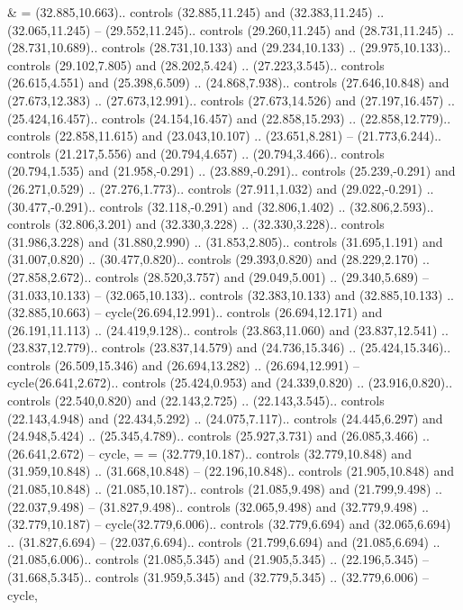 {&} = {(32.885,10.663).. controls (32.885,11.245) and (32.383,11.245) .. (32.065,11.245) -- (29.552,11.245).. controls (29.260,11.245) and (28.731,11.245) .. (28.731,10.689).. controls (28.731,10.133) and (29.234,10.133) .. (29.975,10.133).. controls (29.102,7.805) and (28.202,5.424) .. (27.223,3.545).. controls (26.615,4.551) and (25.398,6.509) .. (24.868,7.938).. controls (27.646,10.848) and (27.673,12.383) .. (27.673,12.991).. controls (27.673,14.526) and (27.197,16.457) .. (25.424,16.457).. controls (24.154,16.457) and (22.858,15.293) .. (22.858,12.779).. controls (22.858,11.615) and (23.043,10.107) .. (23.651,8.281) -- (21.773,6.244).. controls (21.217,5.556) and (20.794,4.657) .. (20.794,3.466).. controls (20.794,1.535) and (21.958,-0.291) .. (23.889,-0.291).. controls (25.239,-0.291) and (26.271,0.529) .. (27.276,1.773).. controls (27.911,1.032) and (29.022,-0.291) .. (30.477,-0.291).. controls (32.118,-0.291) and (32.806,1.402) .. (32.806,2.593).. controls (32.806,3.201) and (32.330,3.228) .. (32.330,3.228).. controls (31.986,3.228) and (31.880,2.990) .. (31.853,2.805).. controls (31.695,1.191) and (31.007,0.820) .. (30.477,0.820).. controls (29.393,0.820) and (28.229,2.170) .. (27.858,2.672).. controls (28.520,3.757) and (29.049,5.001) .. (29.340,5.689) -- (31.033,10.133) -- (32.065,10.133).. controls (32.383,10.133) and (32.885,10.133) .. (32.885,10.663) -- cycle(26.694,12.991).. controls (26.694,12.171) and (26.191,11.113) .. (24.419,9.128).. controls (23.863,11.060) and (23.837,12.541) .. (23.837,12.779).. controls (23.837,14.579) and (24.736,15.346) .. (25.424,15.346).. controls (26.509,15.346) and (26.694,13.282) .. (26.694,12.991) -- cycle(26.641,2.672).. controls (25.424,0.953) and (24.339,0.820) .. (23.916,0.820).. controls (22.540,0.820) and (22.143,2.725) .. (22.143,3.545).. controls (22.143,4.948) and (22.434,5.292) .. (24.075,7.117).. controls (24.445,6.297) and (24.948,5.424) .. (25.345,4.789).. controls (25.927,3.731) and (26.085,3.466) .. (26.641,2.672) -- cycle},
{=} = {(32.779,10.187).. controls (32.779,10.848) and (31.959,10.848) .. (31.668,10.848) -- (22.196,10.848).. controls (21.905,10.848) and (21.085,10.848) .. (21.085,10.187).. controls (21.085,9.498) and (21.799,9.498) .. (22.037,9.498) -- (31.827,9.498).. controls (32.065,9.498) and (32.779,9.498) .. (32.779,10.187) -- cycle(32.779,6.006).. controls (32.779,6.694) and (32.065,6.694) .. (31.827,6.694) -- (22.037,6.694).. controls (21.799,6.694) and (21.085,6.694) .. (21.085,6.006).. controls (21.085,5.345) and (21.905,5.345) .. (22.196,5.345) -- (31.668,5.345).. controls (31.959,5.345) and (32.779,5.345) .. (32.779,6.006) -- cycle},
